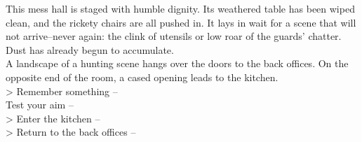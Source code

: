 This mess hall is staged with humble dignity. Its weathered table has been wiped clean, and the rickety chairs are all pushed in. It lays in wait for a scene that will not arrive--never again: the clink of utensils or low roar of the guards' chatter. Dust has already begun to accumulate.\\

A landscape of a hunting scene hangs over the doors to the back offices. On the opposite end of the room, a cased opening leads to the kitchen.\\

> Remember something -- \\
 Test your aim -- \\
> Enter the kitchen -- \\
> Return to the back offices -- 